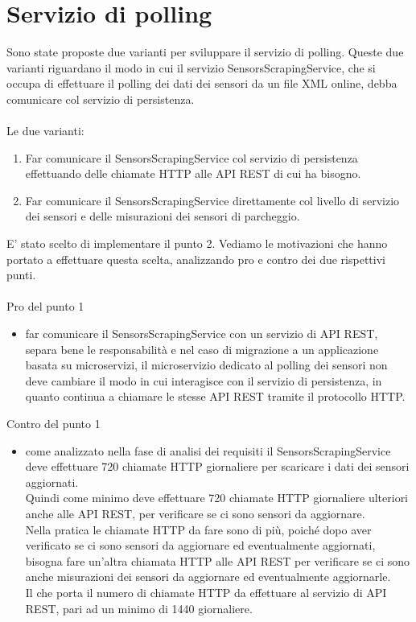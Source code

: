 \section{Servizio di polling}
Sono state proposte due varianti per sviluppare il servizio di polling. Queste due varianti riguardano il
modo in cui il servizio SensorsScrapingService, che si occupa di effettuare il polling dei dati dei sensori
da un file \gls{XML} online, debba comunicare col servizio di persistenza.
\\\\
Le due varianti:
\begin{enumerate}
    \item Far comunicare il SensorsScrapingService col servizio di persistenza effettuando delle chiamate \gls{HTTP} 
        alle \gls{API} \gls{REST} di cui ha bisogno.
    \item Far comunicare il SensorsScrapingService direttamente col livello di servizio dei sensori e delle misurazioni 
    dei sensori di parcheggio.
\end{enumerate}
\leavevmode\newline
E' stato scelto di implementare il punto 2. Vediamo le motivazioni che hanno portato a effettuare questa scelta, analizzando pro e 
contro dei due rispettivi punti.
\\\\
Pro del punto 1
\begin{itemize}
    \item far comunicare il SensorsScrapingService con un servizio di \gls{API} \gls{REST}, separa bene le responsabilità e 
        nel caso di migrazione a un applicazione basata su microservizi, il microservizio dedicato al polling dei sensori 
        non deve cambiare il modo in cui interagisce
        con il servizio di persistenza, in quanto continua a chiamare le stesse \gls{API} \gls{REST} tramite il protocollo \gls{HTTP}.
\end{itemize}
\leavevmode\newline
Contro del punto 1
\begin{itemize}
    \item come analizzato nella fase di analisi dei requisiti il SensorsScrapingService deve effettuare 720 chiamate \gls{HTTP} giornaliere
        per scaricare i dati dei sensori aggiornati. 
        \\
        Quindi come minimo deve effettuare 720 chiamate \gls{HTTP} giornaliere ulteriori anche alle \gls{API} \gls{REST}, per verificare se ci sono sensori
        da aggiornare. 
        \\
        Nella pratica le chiamate \gls{HTTP} da fare sono di più, poiché dopo aver verificato se ci sono sensori da aggiornare ed
        eventualmente aggiornati, bisogna fare un'altra chiamata \gls{HTTP} alle \gls{API} \gls{REST} per verificare se ci sono anche misurazioni dei sensori
        da aggiornare ed eventualmente aggiornarle. 
        \\
        Il che porta il numero di chiamate \gls{HTTP} da effettuare al servizio di \gls{API} \gls{REST}, pari ad un minimo di 1440 giornaliere.
\end{itemize}
